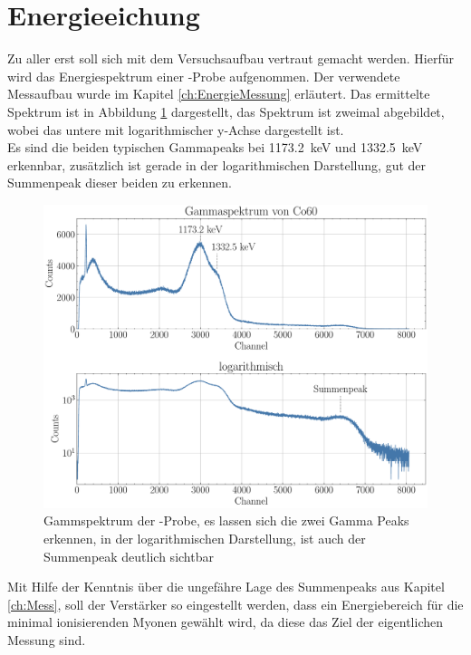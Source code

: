 \documentclass[12pt,a4paper,ngerman]{report}
\begin{document}
	\section{Energieeichung}
		Zu aller erst soll sich mit dem Versuchsaufbau vertraut gemacht werden. Hierfür wird das Energiespektrum einer -Probe aufgenommen. Der verwendete Messaufbau wurde im Kapitel \ref{ch:EnergieMessung} erläutert. Das ermittelte Spektrum ist in Abbildung \ref{img:GammaCo60} dargestellt, das Spektrum ist zweimal abgebildet, wobei das untere mit logarithmischer y-Achse dargestellt ist.\\
		Es sind die beiden typischen Gammapeaks bei \SI{1173.2}{\kilo \eV} und \SI{1332.5}{\kilo \eV} erkennbar, zusätzlich ist gerade in der logarithmischen Darstellung, gut der Summenpeak dieser beiden zu erkennen. 
		\begin{figure}[ht]
			\centering
			\includegraphics[width=\textwidth]{Bilder/GammaCo60.pdf}		
			\caption[Gammspektrum der -Probe]{Gammspektrum der -Probe, es lassen sich die zwei Gamma Peaks erkennen, in der logarithmischen Darstellung, ist auch der Summenpeak deutlich sichtbar}
			\label{img:GammaCo60}
		\end{figure}
	Mit Hilfe der Kenntnis über die ungefähre Lage des Summenpeaks aus Kapitel \ref{ch:Mess}, soll der Verstärker so eingestellt werden, dass ein Energiebereich für die minimal ionisierenden
	Myonen gewählt wird, da diese das Ziel der eigentlichen Messung sind.
\end{document}
